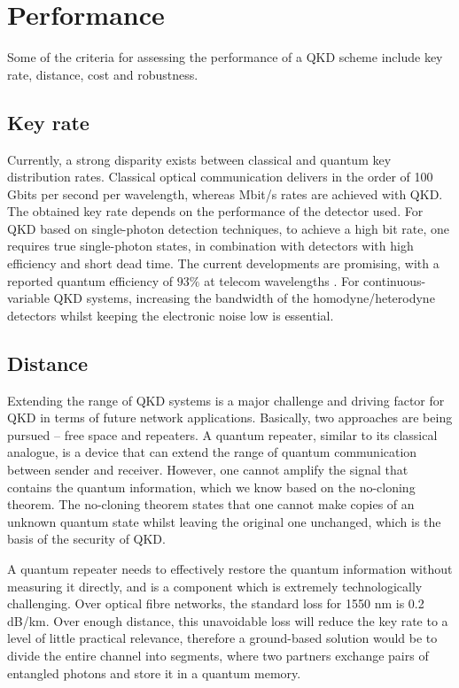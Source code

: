 \documentclass[reprint,
superscriptaddress,
 amsmath,amssymb,
 aps,
prb,
]{revtex4-1}
\begin{document}
\section{Performance}
Some of the criteria for assessing the performance of a QKD scheme include key rate, distance, cost and robustness.
% 
\subsection{Key rate}
Currently, a strong disparity exists between classical and quantum key distribution rates. Classical optical communication delivers in the order of 100 Gbits per second per wavelength, whereas Mbit/s rates are achieved with QKD.
% 
 The obtained key rate depends on the performance of the detector used. For QKD based on single-photon detection techniques, to achieve a high bit rate, one requires true single-photon states, in combination with detectors with high efficiency and short dead time. The current developments are promising, with a reported quantum efficiency of $93\%$ at telecom wavelengths \cite{marsili2013detecting}.
% 
 For continuous-variable QKD systems, increasing the bandwidth of the homodyne/heterodyne detectors whilst keeping the electronic noise low is essential.

\subsection{Distance}
Extending the range of QKD systems is a major challenge and driving factor for QKD in terms of future network applications. Basically, two approaches are being pursued -- free space and repeaters.  A quantum repeater, similar
to its classical analogue, is a device that can extend the range of quantum communication between sender and receiver. However, one cannot amplify the signal that contains the quantum information, which we know based on the no-cloning theorem. The no-cloning theorem states that one cannot make copies of an unknown quantum state whilst leaving the original one unchanged, which is the basis of the security of QKD.

A quantum repeater needs to effectively restore the quantum information without measuring it directly, and is a component which is extremely technologically challenging. 
Over optical fibre networks, the standard loss for 1550 nm is 0.2 dB/km. Over enough distance, this unavoidable loss will reduce the key rate to a level of little practical relevance, therefore a ground-based solution would be to divide the entire channel into segments, where two partners exchange pairs of entangled photons and store it in a quantum memory\cite{PhysRevLett.81.5932,PhysRevA.59.169}.
\end{document}
